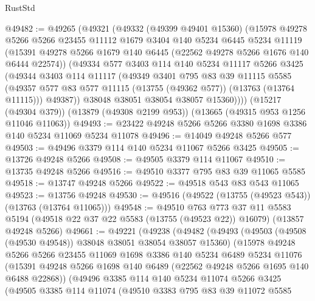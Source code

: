 \begin{lexlean}{RustStd}
\begin{coremodule}
@49482 := @49265
    (@49321
      (@49332
        (@49399 @49401 @15360)
        (@15978
          @49278
          @5266
          @5266
          @23455
          @11112
          @1679
          @3404
          @140
          @5234
          @6445
          @5234
          @11119
          (@15391 @49278 @5266 @1679 @140 @6445 (@22562 @49278 @5266 @1676 @140 @6444 @22574))
          (@49334
            @577
            @3403
            @114
            @140
            @5234
            @11117
            @5266
            @3425
            (@49344
              @3403
              @114
              @11117
              (@49349
                @3401
                @795
                @83
                @39
                @11115
                @5585
                (@49357 @577 @83 @577 @11115 (@13755 (@49362 @577)) (@13763 (@13764 @11115)))
                @49387))
            @38048
            @38051
            @38054
            @38057
            @15360))))
    (@15217 (@49304 @379))
    (@13879 (@49308 @2199 @953))
    (@13665 (@49315 @953 @1256 @11046 @11063))
@49493 := @23422 @49248 @5266 @5266 @3380 @1698 @3386 @140 @5234 @11069 @5234 @11078
@49496 := @14049 @49248 @5266 @577
@49503 := @49496 @3379 @114 @140 @5234 @11067 @5266 @3425
@49505 := @13726 @49248 @5266
@49508 := @49505 @3379 @114 @11067
@49510 := @13735 @49248 @5266
@49516 := @49510 @3377 @795 @83 @39 @11065 @5585
@49518 := @13747 @49248 @5266
@49522 := @49518 @543 @83 @543 @11065
@49523 := @13756 @49248
@49530 := @49516 (@49522 (@13755 (@49523 @543)) (@13763 (@13764 @11065)))
@49548 := @49510
    @763
    @773
    @37
    @11
    @5583
    @5194
    (@49518 @22 @37 @22 @5583 (@13755 (@49523 @22)) @16079)
    (@13857 @49248 @5266)
@49661 := @49221
    (@49238
      (@49482
        (@49493
          (@49503 (@49508 (@49530 @49548)) @38048 @38051 @38054 @38057 @15360)
          (@15978
            @49248
            @5266
            @5266
            @23455
            @11069
            @1698
            @3386
            @140
            @5234
            @6489
            @5234
            @11076
            (@15391 @49248 @5266 @1698 @140 @6489 (@22562 @49248 @5266 @1695 @140 @6488 @22868))
            (@49496
              @3385
              @114
              @140
              @5234
              @11074
              @5266
              @3425
              (@49505
                @3385
                @114
                @11074
                (@49510
                  @3383
                  @795
                  @83
                  @39
                  @11072
                  @5585

\end{coremodule}
\end{lexlean}
